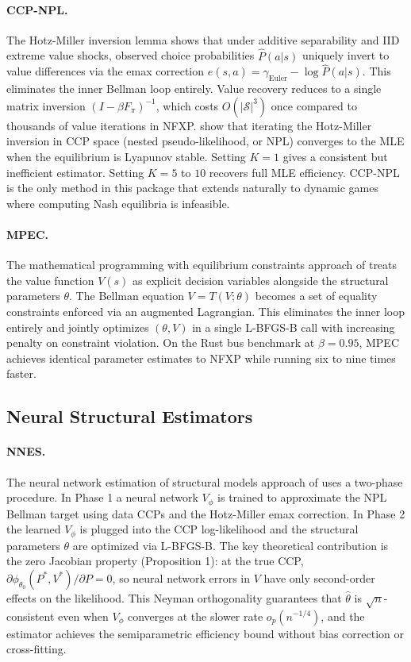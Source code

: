 \paragraph{CCP-NPL.}
The Hotz-Miller inversion lemma \citep{hotzMiller1993} shows that under additive separability and IID extreme value shocks, observed choice probabilities $\hat P(a|s)$ uniquely invert to value differences via the emax correction $e(s,a) = \gamma_{\text{Euler}} - \log \hat P(a|s)$.
This eliminates the inner Bellman loop entirely.
Value recovery reduces to a single matrix inversion $(I - \beta F_\pi)^{-1}$, which costs $O(|\mathcal{S}|^3)$ once compared to thousands of value iterations in NFXP.
\citet{aguirregabiriaMira2002} show that iterating the Hotz-Miller inversion in CCP space (nested pseudo-likelihood, or NPL) converges to the MLE when the equilibrium is Lyapunov stable.
Setting $K=1$ gives a consistent but inefficient estimator.
Setting $K=5$ to $10$ recovers full MLE efficiency.
CCP-NPL is the only method in this package that extends naturally to dynamic games where computing Nash equilibria is infeasible.

\paragraph{MPEC.}
The mathematical programming with equilibrium constraints approach of \citet{suJudd2012} treats the value function $V(s)$ as explicit decision variables alongside the structural parameters $\theta$.
The Bellman equation $V = T(V;\theta)$ becomes a set of equality constraints enforced via an augmented Lagrangian.
This eliminates the inner loop entirely and jointly optimizes $(\theta, V)$ in a single L-BFGS-B call with increasing penalty on constraint violation.
On the Rust bus benchmark at $\beta = 0.95$, MPEC achieves identical parameter estimates to NFXP while running six to nine times faster.


\subsection{Neural Structural Estimators}

\paragraph{NNES.}
The neural network estimation of structural models approach of \citet{nguyen2025} uses a two-phase procedure.
In Phase 1 a neural network $V_\phi$ is trained to approximate the NPL Bellman target using data CCPs and the Hotz-Miller emax correction.
In Phase 2 the learned $V_\phi$ is plugged into the CCP log-likelihood and the structural parameters $\theta$ are optimized via L-BFGS-B.
The key theoretical contribution is the zero Jacobian property (Proposition 1): at the true CCP, $\partial \phi_{\theta_0}(P^*, V^*)/\partial P = 0$, so neural network errors in $V$ have only second-order effects on the likelihood.
This Neyman orthogonality guarantees that $\hat\theta$ is $\sqrt{n}$-consistent even when $V_\phi$ converges at the slower rate $o_p(n^{-1/4})$, and the estimator achieves the semiparametric efficiency bound without bias correction or cross-fitting.


